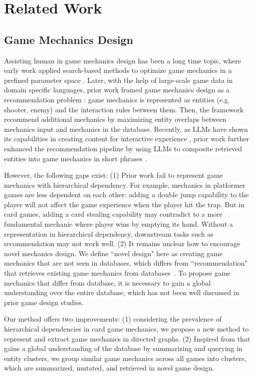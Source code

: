 \section{Related Work}

\subsection{Game Mechanics Design}


Assisting human in game mechanics design has been a long time topic, where early work applied search-based methods to optimize game mechanics in a prefined parameter space \cite{automaticgame2008}. Later, with the help of large-scale game data in domain specific languages, prior work framed game mechanics design as a recommendation problem \cite{pitako}: game mechanics is represented as entities (e.g. shooter, enemy) and the interaction rules between them. Then, the framework recommend additional mechanics by maximizing entity overlaps between mechanics input and mechanics in the database.
Recently, as LLMs have shown its capabilities in creating content for interactive experience \cite{Ammanabrolu_2020,Todd_2023,words2worldsLi2024}, prior work further enhanced the recommendation pipeline by using LLMs to composite retrieved entities into game mechanics in short phrases \cite{charity2023conceptualgame}.

However, the following gaps exist: 
(1) Prior work fail to represent game mechanics with hierarchical dependency. For example, mechanics in platformer games are less dependent on each other: adding a double jump capability to the player will not affect the game experience when the player hit the trap. But in card games, adding a card stealing capability may contradict to a more fundamental mechanic where player wins by emptying its hand. Without a representation in hierarchical dependency, downstream tasks such as recommendation may not work well. 
(2) It remains unclear how to encourage novel mechanics design. We define ``novel design" here as creating game mechanics that are not seen in databases, which differs from ``recommendation" that retrieves existing game mechanics from databases~\cite{pitako}. To propose game mechanics that differ from database, it is necessary to gain a global understanding over the entire database, which has not been well discussed in prior game design studies.


Our method offers two improvements: 
(1) considering the prevalence of hierarchical dependencies in card game mechanics, we propose a new method to represent and extract game mechanics in directed graphs. 
(2) Inspired from \cite{edge2024localglobalgraphrag} that gains a global understanding of the database by summarizing and querying in entity clusters, we group similar game mechanics across all games into clusters, which are summarized, mutated, and retrieved in novel game design.



